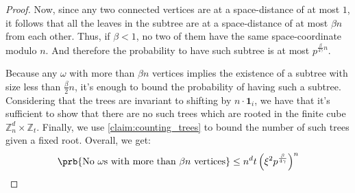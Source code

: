 
  \begin{proof}
  Now, since any two connected vertices are at a space-distance of at most $1$, it follows that all the leaves in the subtree are at a space-distance of at most $\beta n$ from each other. Thus, if $\beta < 1$, no two of them have the same space-coordinate modulo $n$. And therefore the probability to have such subtree is at most $p^{\frac{\beta}{4\gamma}n} $. 
  
Because any $\omega$ with more than $\beta n$ vertices implies the existence of a subtree with size less than $\frac{\beta}{2}n$, it's enough to bound the probability of having such a subtree. Considering that the trees are invariant to shifting by $n \cdot \mathbf{1}_{i}$, we have that it's sufficient to show that there are no such trees which are rooted in the finite cube $\mathbb{Z}_{n}^{d} \times \mathbb{Z}_{t}$. Finally, we use \cref{claim:counting_trees} to bound the number of such trees given a fixed root. Overall, we get:
  \begin{equation*}
    \begin{split}
      \prb{\text{No } \omega \text{s with more than  } \beta n \text{ vertices} } \le n^{d} t  \left( \xi^{2}  p^{\frac{\beta}{4\gamma}} \right)^{n}   
    \end{split}
  \end{equation*}
\end{proof}


